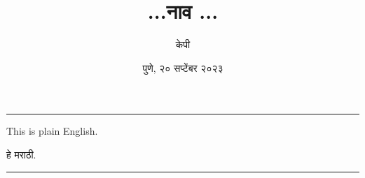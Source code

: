 \documentclass[a4paper]{article}   %
\begin{document}
\title{...नाव ...}
\author{केपी}
\date{पुणे, २० सप्टेंबर २०२३}
\maketitle
\vspace{5mm}
\hrule

\begin{english}
This is plain English.
\end{english}

हे मराठी.
\vspace{5mm}
\hrule
\end{document}
